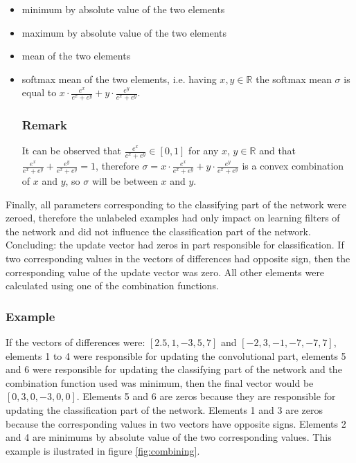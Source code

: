 \documentclass[a4paper,10pt]{report}
\begin{document}
      \begin{itemize}
       \item minimum by absolute value of the two elements
       \item maximum by absolute value of the two elements
       \item mean of the two elements
       \item softmax mean of the two elements, i.e. having $x, y \in \mathbb{R}$ the softmax mean $\sigma$ is equal to $x \cdot \frac{e^x}{e^x + e^y} + y \cdot \frac{e^y}{e^x + e^y}$.
       
       \subsubsection{Remark}
       It can be observed that $\frac{e^x}{e^x + e^y} \in [0, 1]$ for any $x$, $y \in \mathbb{R}$ and that $\frac{e^x}{e^x + e^y} + \frac{e^y}{e^x + e^y} = 1$, therefore $\sigma = x \cdot \frac{e^x}{e^x + e^y} + y \cdot \frac{e^y}{e^x + e^y}$ is a convex combination of $x$ and $y$, so $\sigma$ will be between $x$ and $y$.\\
      \end{itemize}
      
      Finally, all parameters corresponding to the classifying part of the network were zeroed, therefore the unlabeled examples had only impact on learning filters of the network and did not influence the classification part of the network.\\
	
      Concluding: the update vector had zeros in part responsible for classification. If two corresponding values in the vectors of differences had opposite sign, then the corresponding value of the update vector was zero. All other elements were calculated using one of the combination functions.\\
      
      \subsubsection{Example}
      If the vectors of differences were: $[2.5, 1, -3, 5, 7]$ and $[-2, 3, -1, -7, -7, 7]$, elements 1 to 4 were responsible for updating the convolutional part, elements 5 and 6 were responsible for updating the classifying part of the network and the combination function used was minimum, then the final vector would be $[0, 3, 0, -3, 0, 0]$. Elements 5 and 6 are zeros because they are responsible for updating the classification part of the network. Elements 1 and 3 are zeros because the corresponding values in two vectors have opposite signs. Elements 2 and 4 are minimums by absolute value of the two corresponding values. This example is ilustrated in figure \ref{fig:combining}.\\
      
\end{document}
